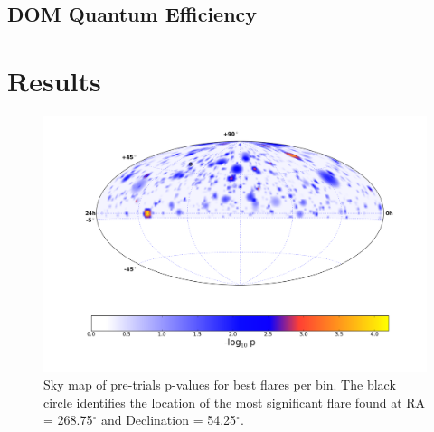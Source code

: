 \documentclass{gatech-thesis}
\begin{document}
\section{DOM Quantum Efficiency}

\chapter{Results}


\begin{figure}[ht]
  \begin{center}
    \includegraphics[width=1.0\textwidth,keepaspectratio]{RealResultSkyMap.png}
  \end{center}
  \caption{Sky map of pre-trials p-values for best flares per bin. The black circle identifies the location of the most significant flare found at RA = 268.75$^\circ$ and Declination = 54.25$^\circ$.}
  \label{fig:RealSkyMap}
\end{figure}
\end{document}
